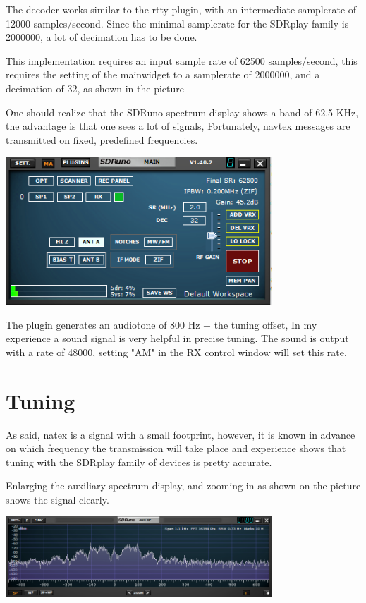\documentclass[11pt]{article}
\begin{document}
The decoder works similar to the rtty plugin, with an intermediate
samplerate of 12000 samples/second. Since the minimal samplerate for the
SDRplay family is 2000000, a lot of decimation has to be done.
\par
This implementation requires an input sample rate of 62500 samples/second,
this requires the setting of the mainwidget to a samplerate of 2000000,
and a decimation of 32, as shown in the picture

One should realize that the SDRuno spectrum display shows a band of 62.5
KHz, the advantage is that one sees a lot of signals, 
Fortunately, navtex messages are transmitted on fixed, predefined
frequencies.

\includegraphics[width=100mm]{main-widget.png}

The plugin generates an audiotone of 800 Hz + the tuning offset,
In my experience a sound signal  is very helpful in precise tuning.
The sound is output with a rate of 48000, setting "AM" in the RX control window
will set this rate.

\section{Tuning}
As said, natex is a signal with a small footprint, however, it is
known in advance on which frequency the transmission will take place
and experience shows that tuning with the SDRplay family of devices
is pretty accurate.

Enlarging the auxiliary spectrum display, and zooming in as shown on the
picture shows the signal clearly.

\includegraphics[width=100mm]{auxiliary-spectrum-display.png}
\end{document}

